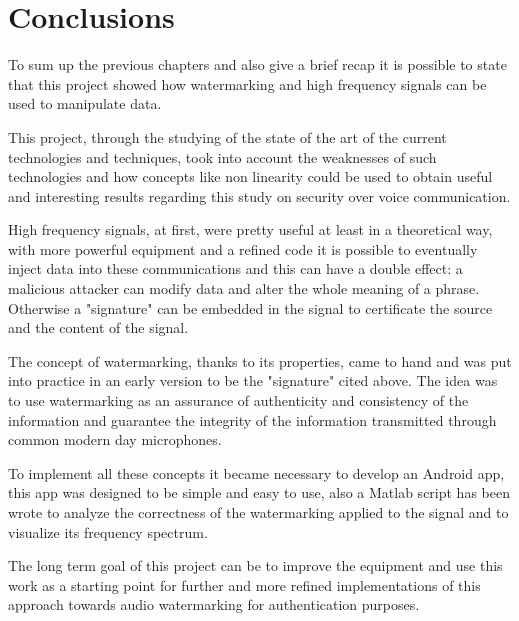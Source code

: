 \chapter{Conclusions}
To sum up the previous chapters and also give a brief recap it is possible to state that this project showed how watermarking and high frequency signals can be used to manipulate data.




This project, through the studying of the state of the art of the current technologies and techniques, took into account the weaknesses of such technologies and how concepts like non linearity could be used to obtain useful and interesting results regarding this study on security over voice communication.



High frequency signals, at first, were pretty useful at least in a theoretical way, with more
powerful equipment and a refined code it is possible to eventually inject data into these
communications and this can have a double effect: a malicious attacker can modify data and alter
the whole meaning of a phrase. Otherwise a "signature" can be embedded in the signal to certificate the source and the content of the signal.



The concept of watermarking, thanks to its properties, came to hand and was put into practice in an early version to be the "signature" cited above. The idea was to use watermarking as an assurance of authenticity and consistency of the information and guarantee the integrity of the information transmitted through common modern day microphones.



To implement all these concepts it became necessary to develop an Android app, this app was designed to be simple and easy to use, also a Matlab script has been wrote to analyze the correctness of the watermarking applied to the signal and to visualize its frequency spectrum. 


The long term goal of this project can be to improve the equipment and use this work as a starting point for further and more refined implementations of this approach towards audio watermarking for authentication purposes.

